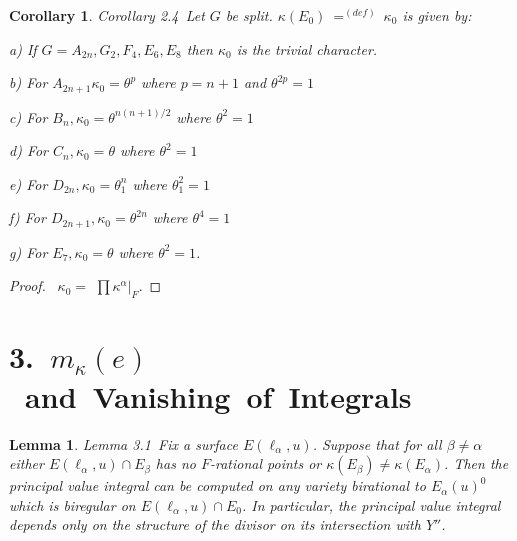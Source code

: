 \documentclass{memo-l}
\newtheorem{lemma}[theorem]{Lemma}
\newtheorem{corollary}[theorem]{Corollary}
\theoremstyle{definition}
\theoremstyle{remark}
\numberwithin{section}{chapter}
\numberwithin{equation}{chapter}
\begin{document}
{\medskip}

\begin{corollary}{Corollary 2.4}\  Let $G$ be split.
${\kappa}(E_{0})\ {\mathrel{\mathop=^{(def)}}}\ {\kappa}_{0}$ is given by:

a) If $G = A_{2n}, G_{2}, F_{4}, E_{6}, E_{8}$ then ${\kappa}_{0}$ is the
trivial character.

b) For $A_{2n+1} {\kappa}_{0}  =  {\theta}^{p}$ where $p = n+1$ and
${\theta}^{2p} = 1$

c) For $B_{n}, {\kappa}_{0}  =  {\theta}^{n(n+1)/2}$ where
${\theta}^{2} = 1$

d) For $C_{n}, {\kappa}_{0}  =  {\theta}$ where ${\theta}^{2} = 1$

e) For $D_{2n}, {\kappa}_{0}  =  {\theta}_{1}^{n}$ where ${\theta}_{1}^{2} = 1$

f) For $D_{2n+1}, {\kappa}_{0}  =  {\theta}^{2n}$ where ${\theta}^{4} = 1$

g) For $E_{7}, {\kappa}_{0}  =  {\theta}$ where ${\theta}^{2} = 1$.
\end{corollary}


\begin{proof} \  ${\kappa}_{0}  = $ $\prod{\kappa}^{{\alpha}}\vert_{F} .$
\end{proof} 


\section{3.\  $m_{{\kappa}}(e)$\ and\ Vanishing\ of\ Integrals}


\begin{lemma}{Lemma 3.1}\ Fix a surface $E({\ell}_{{\alpha}},u)$.  Suppose
that for all ${\beta} \ne {\alpha}$ either $E({\ell}_{{\alpha}},u)  \cap 
E_{{\beta}}$ has no $F$-rational points or ${\kappa}(E_{{\beta}})  \ne
{\kappa}(E_{{\alpha}})$.  Then the principal value integral can be computed
on any variety birational to $E_{{\alpha}}(u)^{0}$ which is biregular on
$E({\ell}_{{\alpha}},u)  \cap  E_{0}$.  In particular, the principal value
integral depends only on the structure of the divisor on its intersection
with $Y''$.
\end{lemma}
\end{document}
